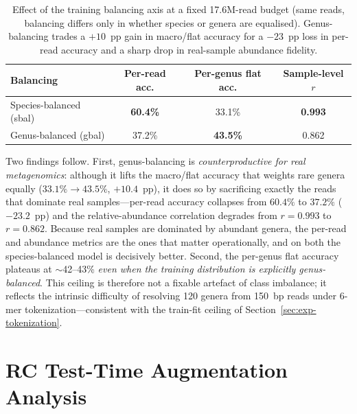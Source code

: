 \begin{table}[htbp]
    \centering
    \caption{Effect of the training balancing axis at a fixed 17.6M-read budget (same reads, balancing differs only in whether species or genera are equalised). Genus-balancing trades a $+10$~pp gain in macro/flat accuracy for a $-23$~pp loss in per-read accuracy and a sharp drop in real-sample abundance fidelity.}
    \label{tab:genus-balance}
    \small
    \begin{tabular}{lccc}
        \toprule
        \textbf{Balancing} & \textbf{Per-read acc.} & \textbf{Per-genus flat acc.} & \textbf{Sample-level $r$} \\
        \midrule
        Species-balanced (sbal) & \textbf{60.4\%} & 33.1\% & \textbf{0.993} \\
        Genus-balanced (gbal)   & 37.2\% & \textbf{43.5\%} & 0.862 \\
        \bottomrule
    \end{tabular}
\end{table}

Two findings follow. First, genus-balancing is \emph{counterproductive for real metagenomics}: although it lifts the macro/flat accuracy that weights rare genera equally ($33.1\% \to 43.5\%$, $+10.4$~pp), it does so by sacrificing exactly the reads that dominate real samples---per-read accuracy collapses from $60.4\%$ to $37.2\%$ ($-23.2$~pp) and the relative-abundance correlation degrades from $r=0.993$ to $r=0.862$. Because real samples are dominated by abundant genera, the per-read and abundance metrics are the ones that matter operationally, and on both the species-balanced model is decisively better. Second, the per-genus flat accuracy plateaus at $\sim$42--43\% \emph{even when the training distribution is explicitly genus-balanced}. This ceiling is therefore not a fixable artefact of class imbalance; it reflects the intrinsic difficulty of resolving 120 genera from 150~bp reads under 6-mer tokenization---consistent with the train-fit ceiling of Section~\ref{sec:exp-tokenization}.

\section{RC Test-Time Augmentation Analysis}
\label{sec:exp-rc-tta}

